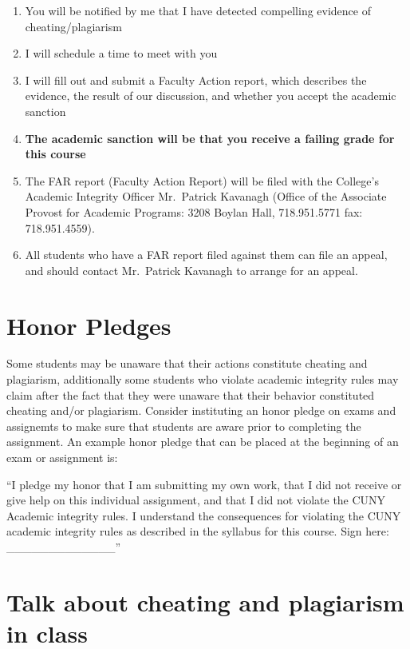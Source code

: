 \documentclass[]{book}
\providecommand{\tightlist}{%
  \setlength{\itemsep}{0pt}\setlength{\parskip}{0pt}}
\theoremstyle{definition}
\theoremstyle{definition}
\theoremstyle{definition}
\theoremstyle{remark}
\begin{document}
\begin{enumerate}
\def\labelenumi{\arabic{enumi}.}
\tightlist
\item
  You will be notified by me that I have detected compelling evidence of
  cheating/plagiarism
\item
  I will schedule a time to meet with you
\item
  I will fill out and submit a Faculty Action report, which describes
  the evidence, the result of our discussion, and whether you accept the
  academic sanction
\item
  \textbf{The academic sanction will be that you receive a failing grade
  for this course}
\item
  The FAR report (Faculty Action Report) will be filed with the
  College's Academic Integrity Officer Mr.~Patrick Kavanagh (Office of
  the Associate Provost for Academic Programs: 3208 Boylan Hall,
  718.951.5771 fax: 718.951.4559).
\item
  All students who have a FAR report filed against them can file an
  appeal, and should contact Mr.~Patrick Kavanagh to arrange for an
  appeal.
\end{enumerate}

\section{Honor Pledges}\label{honor-pledges}

Some students may be unaware that their actions constitute cheating and
plagiarism, additionally some students who violate academic integrity
rules may claim after the fact that they were unaware that their
behavior constituted cheating and/or plagiarism. Consider instituting an
honor pledge on exams and assignemts to make sure that students are
aware prior to completing the assignment. An example honor pledge that
can be placed at the beginning of an exam or assignment is:

``I pledge my honor that I am submitting my own work, that I did not
receive or give help on this individual assignment, and that I did not
violate the CUNY Academic integrity rules. I understand the consequences
for violating the CUNY academic integrity rules as described in the
syllabus for this course. Sign here: \_\_\_\_\_\_\_\_\_\_\_\_\_''

\section{Talk about cheating and plagiarism in
class}\label{talk-about-cheating-and-plagiarism-in-class}
\end{document}
